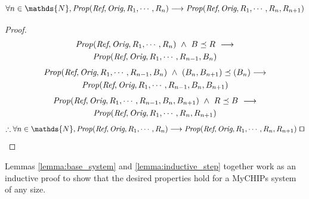 \documentclass[runningheads]{llncs}
\begin{document}
\begin{lemma}
\label{lemma:inductive_step}
$$
\forall n \in \mathds{N}, \mathit{Prop}(\emph{Ref}, \emph{Orig}, R_1, \dotsm, R_n) \longrightarrow \mathit{Prop}(\emph{Ref}, \emph{Orig}, R_1, \dotsm, R_n, R_{n+1})
$$
\begin{proof}\ \\
    \vspace*{-20pt}
    \begin{multline*}
    \mathit{Prop}(\emph{Ref}, \emph{Orig}, R_1, \dotsm, R_n)\ \wedge\  B \preceq R\ \longrightarrow \\
    \mathit{Prop}(\emph{Ref}, \emph{Orig}, R_1, \dotsm, R_{n-1}, B_n)
    \end{multline*}
    \vspace*{-25pt}
    \begin{multline*}
    \mathit{Prop}(\emph{Ref}, \emph{Orig}, R_1, \dotsm, R_{n-1}, B_n)\ \wedge\  (B_n, B_{n+1}) \preceq (B_n)
 \longrightarrow 
    \\    
    \mathit{Prop}(\emph{Ref}, \emph{Orig}, R_1, \dotsm, R_{n-1}, B_n, B_{n+1})
    \end{multline*}
    \vspace*{-25pt}
    \begin{multline*}
    \mathit{Prop}(\emph{Ref}, \emph{Orig}, R_1, \dotsm, R_{n-1}, B_n, B_{n+1})\ \wedge\ R \preceq B\ \longrightarrow
    \\
    \mathit{Prop}(\emph{Ref}, \emph{Orig}, R_1, \dotsm, R_n, R_{n+1})
    \end{multline*}
    \vspace*{-25pt}
    \begin{multline*}
    \therefore  \forall n \in \mathds{N}, \mathit{Prop}(\emph{Ref}, \emph{Orig}, R_1, \dotsm, R_n) \longrightarrow \mathit{Prop}(\emph{Ref}, \emph{Orig}, R_1, \dotsm, R_n, R_{n+1})\ \qed
    \end{multline*}
\end{proof}
\end{lemma}

Lemmas \ref{lemma:base_system} and \ref{lemma:inductive_step} together work as an inductive proof to show that the desired properties hold for a MyCHIPs system of any size.
\end{document}
